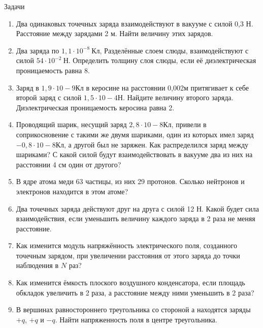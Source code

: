 \documentclass[a5paper, 10pt]{diss_4}
\renewcommand{\'}{\,'}
\begin{document}
\begin{center}
   Задачи
\end{center}
\begin{enumerate}
\item Два одинаковых точечных заряда взаимодействуют в вакууме с силой 0,3 Н. Расстояние между зарядами 2 м. Найти величину этих зарядов.
\item Два заряда по $1,1\cdot10^{-8}\ Кл$, Разделённые слоем слюды, взаимодействуют с силой $54\cdot10^{-2}\ Н$. Определить толщину слоя слюды, если её диэлектрическая проницаемость равна 8.
\item Заряд в $1,9\cdot10-9 Кл$ в керосине на расстоянии 0,002м притягивает к себе второй заряд с силой $1,5\cdot10-4 Н$. Найдите величину второго заряда. Диэлектрическая проницаемость керосина равна 2.
\item Проводящий шарик, несущий заряд $2,8\cdot10-8 Кл$, привели в соприкосновение с такими же двумя шариками, один из которых имел заряд $-0,8\cdot10-8 Кл$, а другой был не заряжен. Как распределился заряд между шариками? С какой силой будут взаимодействовать в вакууме два из них на расстоянии 4 см один от другого?
\item В ядре атома меди 63 частицы, из них 29 протонов. Сколько нейтронов и электронов находится в этом атоме?
\item Два точечных заряда действуют друг на друга с силой 12 Н. Какой будет сила взаимодействия, если уменьшить величину каждого заряда  в 2 раза не меняя расстояние.
\item Как изменится модуль напряжённость электрического поля, созданного точечным зарядом, при увеличении расстояния от этого заряда до точки наблюдения в $N$ раз?
\item Как изменится ёмкость плоского воздушного конденсатора, если площадь обкладок увеличить в 2 раза, а расстояние между ними уменьшить в 2 раза?
\item В вершинах равностороннего треугольника со стороной а находятся заряды $+q$, $+q$ и $-q$. Найти напряженность поля в центре треугольника.
\end{enumerate}
\end{document}
